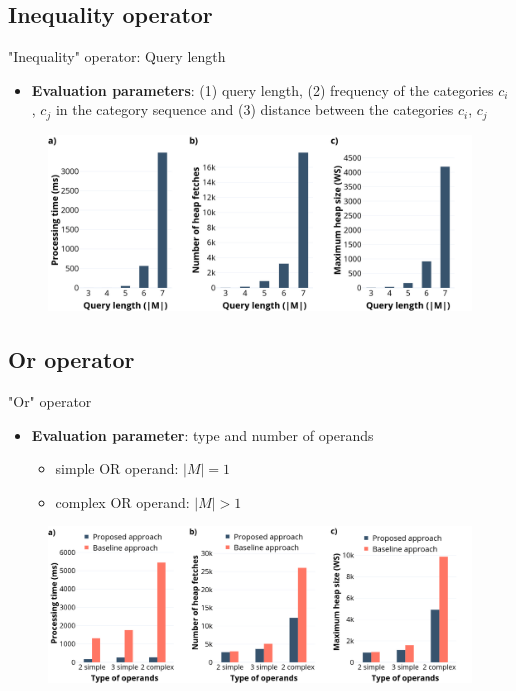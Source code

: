 \documentclass[18pt]{beamer}
\begin{document}
	\subsection{Inequality operator}
		\begin{frame}{"Inequality" operator: Query length}
		
			\begin{itemize}
				\item \textbf{Evaluation parameters}: \textcolor{kit}{(1) query length}, (2) frequency of the categories $c_i$, $c_j$ in the category sequence and (3) distance between the categories $c_i$, $c_j$
			\end{itemize}
		
			\begin{figure}[h]
				\includegraphics[scale=0.275]{neo_length.png}
			\end{figure}
		
		\end{frame}
	
	\subsection{Or operator}
		\begin{frame}{"Or" operator}
		
			\begin{itemize}
				\item \textbf{Evaluation parameter}: type and number of operands
				\begin{itemize}
					\item simple OR operand: $|M| = 1$
					\item complex OR operand: $|M| > 1$
				\end{itemize}
			\end{itemize}
		
			\begin{figure}[H]
				\includegraphics[scale=0.25]{or.png}
			\end{figure}
		
		\end{frame}
	
\end{document}
